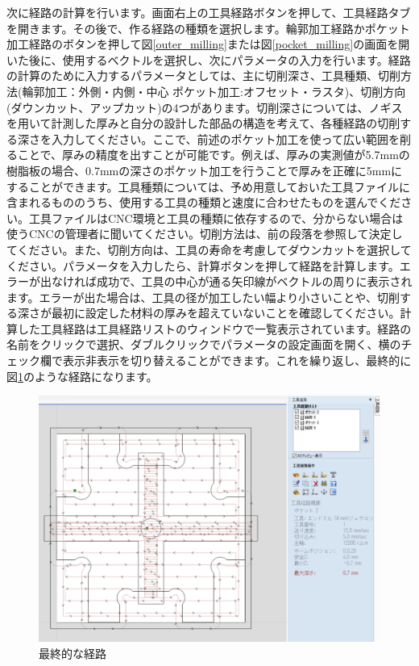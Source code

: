 \documentclass[b5paper, 9pt, twocolumn, titlepage,openany]{jsbook}%
\begin{document}

\clearpage
次に経路の計算を行います。画面右上の工具経路ボタンを押して、工具経路タブを開きます。その後で、作る経路の種類を選択します。輪郭加工経路かポケット加工経路のボタンを押して図\ref{outer_milling}または図\ref{pocket_milling}の画面を開いた後に、使用するベクトルを選択し、次にパラメータの入力を行います。経路の計算のために入力するパラメータとしては、主に切削深さ、工具種類、切削方法(輪郭加工：外側・内側・中心 ポケット加工:オフセット・ラスタ)、切削方向(ダウンカット、アップカット)の4つがあります。切削深さについては、ノギスを用いて計測した厚みと自分の設計した部品の構造を考えて、各種経路の切削する深さを入力してください。ここで、前述のポケット加工を使って広い範囲を削ることで、厚みの精度を出すことが可能です。例えば、厚みの実測値が5.7mmの樹脂板の場合、0.7mmの深さのポケット加工を行うことで厚みを正確に5mmにすることができます。工具種類については、予め用意しておいた工具ファイルに含まれるもののうち、使用する工具の種類と速度に合わせたものを選んでください。工具ファイルはCNC環境と工具の種類に依存するので、分からない場合は使うCNCの管理者に聞いてください。切削方法は、前の段落を参照して決定してください。また、切削方向は、工具の寿命を考慮してダウンカットを選択してください。パラメータを入力したら、計算ボタンを押して経路を計算します。エラーが出なければ成功で、工具の中心が通る矢印線がベクトルの周りに表示されます。エラーが出た場合は、工具の径が加工したい幅より小さいことや、切削する深さが最初に設定した材料の厚みを超えていないことを確認してください。計算した工具経路は工具経路リストのウィンドウで一覧表示されています。経路の名前をクリックで選択、ダブルクリックでパラメータの設定画面を開く、横のチェック欄で表示非表示を切り替えることができます。これを繰り返し、最終的に図\ref{milling_vector}のような経路になります。\\

\begin{figure}[tbh]
  \begin{center}
    \begin{minipage}{0.9\columnwidth}
      \includegraphics[width=\columnwidth]{milling_vector_trim.png}
    \end{minipage}
    \caption{最終的な経路    \label{milling_vector}}
  \end{center}
\end{figure}
\end{document}
